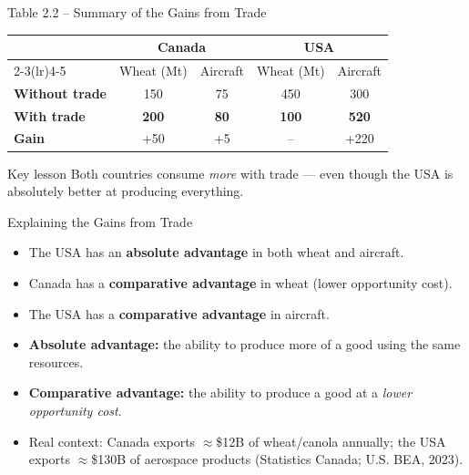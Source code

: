 \documentclass[aspectratio=169]{beamer}
\begin{document}
\begin{frame}{Table 2.2 -- Summary of the Gains from Trade}
\begin{center}
\renewcommand{\arraystretch}{1.5}
\begin{tabular}{lcccc}
\toprule
 & \multicolumn{2}{c}{\textbf{\color{accent}Canada}} & \multicolumn{2}{c}{\textbf{\color{canadared}USA}} \\
\cmidrule(lr){2-3}\cmidrule(lr){4-5}
 & Wheat (Mt) & Aircraft & Wheat (Mt) & Aircraft \\
\midrule
\textbf{Without trade} & 150 & 75 & 450 & 300 \\
\textbf{With trade} & \textcolor{ppfgreen}{\textbf{200}} & \textcolor{ppfgreen}{\textbf{80}} & \textcolor{ppfgreen}{\textbf{100}} & \textcolor{ppfgreen}{\textbf{520}} \\
\textbf{Gain} & \textcolor{leafgreen}{+50} & \textcolor{leafgreen}{+5} & \textcolor{leafgreen}{--} & \textcolor{leafgreen}{+220} \\
\bottomrule
\end{tabular}
\end{center}
\vspace{0.5em}
\begin{block}{Key lesson}
Both countries consume \emph{more} with trade --- even though the USA is absolutely better at producing everything.
\end{block}
\end{frame}

\begin{frame}{Explaining the Gains from Trade}
\transfade
\begin{itemize}[<+->]
  \item The USA has an \textbf{absolute advantage} in both wheat and aircraft.
  \item Canada has a \textbf{comparative advantage} in wheat (lower opportunity cost).
  \item The USA has a \textbf{comparative advantage} in aircraft.
  \item \textbf{Absolute advantage:} the ability to produce more of a good using the same resources.
  \item \textbf{Comparative advantage:} the ability to produce a good at a \emph{lower opportunity cost}.
  \item Real context: Canada exports $\approx$\$12B of wheat/canola annually; the USA exports $\approx$\$130B of aerospace products (Statistics Canada; U.S. BEA, 2023).
\end{itemize}
\end{frame}
\end{document}
